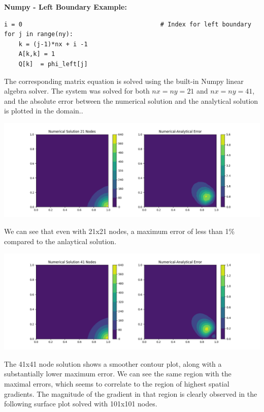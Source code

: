 \documentclass[11pt]{article}
\begin{document}
\textbf{Numpy - Left Boundary Example:} 
\begin{verbatim}
i = 0                                      # Index for left boundary
for j in range(ny):
    k = (j-1)*nx + i -1
    A[k,k] = 1
    Q[k]  = phi_left[j]
\end{verbatim}

The corresponding matrix equation is solved using the built-in Numpy linear algebra solver. 
The system was solved for both $nx=ny=21$ and $nx=ny=41$, and the absolute error between the numerical solution and the analytical solution is plotted in the domain..

\includegraphics[width=15cm]{./figures/21node.png}


We can see that even with 21x21 nodes, a maximum error of less than 1\% compared to the anlaytical solution. 

\includegraphics[width=15cm]{./figures/41node.png}


The 41x41 node solution shows a smoother contour plot, along with a substantially lower maximum error. We can see the same region with the maximal errors, which seems to correlate to the region of highest spatial gradients. The magnitude of the gradient in that region is clearly observed in the following surface plot solved with 101x101 nodes.
\end{document}
